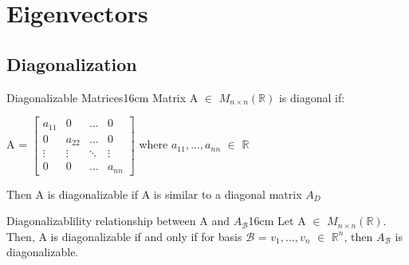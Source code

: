 \newpage

\section[Day 5: Eigenvectors]{ Eigenvectors }

\subsection{ Diagonalization }

    \begin{definition}{Diagonalizable Matrices}{16cm}
        Matrix A $\in$ $M_{n \times n}(\mathbb{R})$
        is {\color{lblue} diagonal} if:

        \hspace{0.5cm}
        A =
        $\begin{bmatrix}
            a_{11} & 0 & \hdots & 0 \\
            0 & a_{22} & \hdots & 0 \\
            \vdots & \vdots & \ddots & \vdots \\
            0 & 0 & \hdots & a_{nn}
        \end{bmatrix}$
        \hspace{1cm}
        where $a_{11},...,a_{nn}$ $\in$ $\mathbb{R}$

        Then A is {\color{lblue} diagonalizable} if
        A is similar to a diagonal matrix $A_D$
    \end{definition}

    \vspace{0.5cm}



    \begin{wtheorem}{Diagonalizablility relationship between A
    and $A_{\mathcal{B}}$}{16cm}
        Let A $\in$ $M_{n \times n}(\mathbb{R})$.
        Then, A is diagonalizable if and only if
        for basis $\mathcal{B}$ = $v_1,...,v_n$ $\in$ $\mathbb{R}^n$, then
        $A_{\mathcal{B}}$ is diagonalizable.
    \end{wtheorem}

